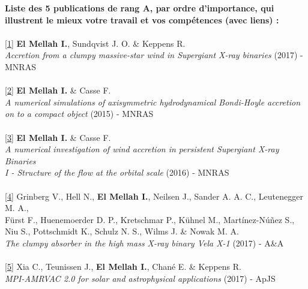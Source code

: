 \documentclass[11pt]{article}
\begin{document}
{\bf Liste des 5 publications de rang A, par ordre d'importance, qui illustrent le mieux votre travail et vos comp\'etences   (avec liens) :}\\ \\
\href{http://adsabs.harvard.edu/abs/2017arXiv171108709E}{[1]} \textbf{El Mellah I.}, Sundqvist J. O. \& Keppens R.\\ 
\emph{Accretion from a clumpy massive-star wind in Supergiant X-ray binaries} (2017) - MNRAS\\ \\
\href{http://adsabs.harvard.edu/abs/2015MNRAS.454.2657E}{[2]} \textbf{El Mellah I.} \& Casse F. \\ 
\emph{A numerical simulations of axisymmetric hydrodynamical Bondi-Hoyle accretion}\\
\emph{on to a compact object} (2015) - MNRAS\\ \\
\href{http://adsabs.harvard.edu/abs/2017MNRAS.467.2585E}{[3]} \textbf{El Mellah I.} \& Casse F. \\ 
\emph{A numerical investigation of wind accretion in persistent Supergiant X-ray Binaries}\\
\emph{I - Structure of the flow at the orbital scale} (2016) - MNRAS\\ \\
\href{http://adsabs.harvard.edu/abs/2017arXiv171106743G}{[4]} Grinberg V., Hell N., \textbf{El Mellah I.}, Neilsen J., Sander A. A. C., Leutenegger M. A.,\\
F\"{u}rst F., Huenemoerder D. P., Kretschmar P., K\"{u}hnel M., Mart\'{i}nez-N\'{u}\~{n}ez S.,\\
Niu S., Pottschmidt K., Schulz N. S., Wilms J. \& Nowak M. A.\\ 
\emph{The clumpy absorber in the high mass X-ray binary Vela X-1} (2017) - A\&A\\ \\
\href{http://adsabs.harvard.edu/abs/2017arXiv171006140X}{[5]} Xia C., Teunissen J., \textbf{El Mellah I.}, Chan\'{e} E. \& Keppens R.\\ 
\emph{MPI-AMRVAC 2.0 for solar and astrophysical applications} (2017) - ApJS\\ 
\end{document}
